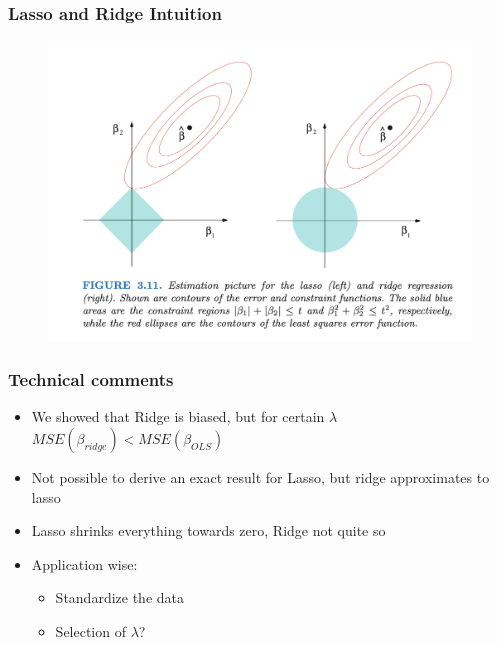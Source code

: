 \documentclass[
  shownotes,
  xcolor={svgnames},
  hyperref={colorlinks,citecolor=DarkBlue,linkcolor=DarkRed,urlcolor=DarkBlue}
  ]{beamer}
\begin{document}
\begin{frame}[fragile]
\frametitle{Lasso and Ridge Intuition}

   \begin{figure}[H] \centering
            \captionsetup{justification=centering}
              \includegraphics[scale=0.4]{figures/lasso_ridge}
 \end{figure}

 \end{frame}
\begin{frame}[fragile]
\frametitle{Technical comments}

\begin{itemize}
 \item We showed that Ridge is biased, but for certain $\lambda$ $MSE(\beta_{ridge})<MSE(\beta_{OLS})$
 \bigskip
 \item Not possible to derive an exact result for Lasso, but ridge approximates to lasso
 \bigskip
 \item Lasso shrinks everything towards zero, Ridge not quite so
 \bigskip
 \item Application wise:
\begin{itemize}
 \item Standardize the data
 \bigskip
 \item Selection of $\lambda$?
\end{itemize}
\end{itemize}

 \end{frame}
\end{document}
